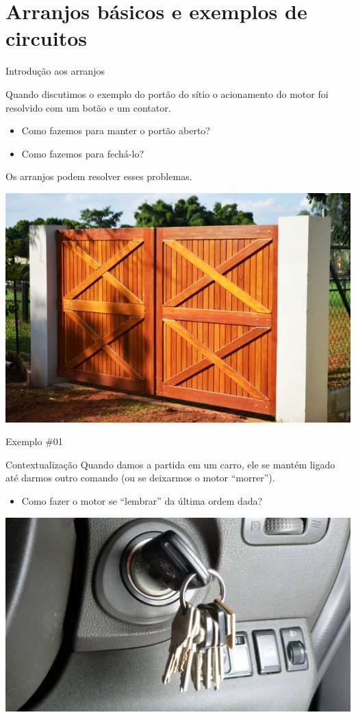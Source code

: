 \section{Arranjos básicos e exemplos de circuitos}

\begin{frame}{Introdução aos arranjos}
\begin{block}{}
	Quando discutimos o exemplo do portão do sítio o acionamento do motor foi resolvido com um botão e um contator.
	\begin{itemize}
		\item Como fazemos para manter o portão aberto?
		\item Como fazemos para fechá-lo?
	\end{itemize}
	Os arranjos podem resolver esses problemas.
\end{block}

\centerline{\includegraphics[width=0.6\linewidth]{Figuras/Ch07/fig0.jpg}}
\end{frame}

\begin{frame}{Exemplo \#01}
\begin{block}{Contextualização}
	Quando damos a partida em um carro, ele se mantém ligado até darmos outro comando (ou se deixarmos o motor ``morrer'').
	
	\begin{itemize}
		\item Como fazer o motor se ``lembrar'' da última ordem dada?
	\end{itemize}
\end{block}

\centerline{\includegraphics[width=0.8\linewidth]{Figuras/Ch07/fig1.jpg}}
\end{frame}


